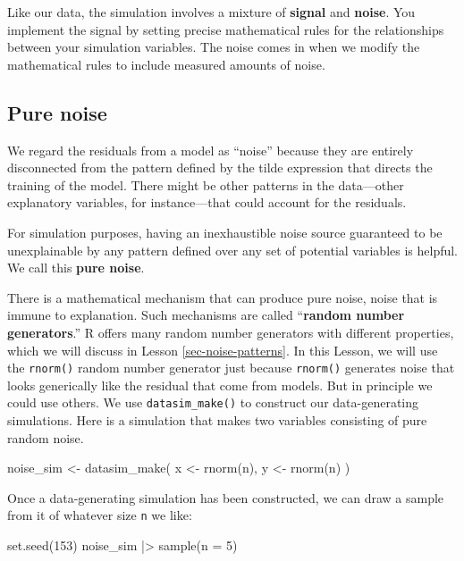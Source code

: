 \documentclass[
  letterpaper,
  DIV=11,
  numbers=noendperiod,
  oneside]{scrartcl}
\newenvironment{Shaded}{\begin{snugshade}}{\end{snugshade}}
\newcommand{\AttributeTok}[1]{\textcolor[rgb]{0.40,0.45,0.13}{#1}}
\newcommand{\DecValTok}[1]{\textcolor[rgb]{0.68,0.00,0.00}{#1}}
\newcommand{\FunctionTok}[1]{\textcolor[rgb]{0.28,0.35,0.67}{#1}}
\newcommand{\NormalTok}[1]{\textcolor[rgb]{0.00,0.23,0.31}{#1}}
\newcommand{\OtherTok}[1]{\textcolor[rgb]{0.00,0.23,0.31}{#1}}
\newcommand{\SpecialCharTok}[1]{\textcolor[rgb]{0.37,0.37,0.37}{#1}}
\begin{document}
Like our data, the simulation involves a mixture of \textbf{signal} and
\textbf{noise}. You implement the signal by setting precise mathematical
rules for the relationships between your simulation variables. The noise
comes in when we modify the mathematical rules to include measured
amounts of noise.

\subsection{Pure noise}\label{sec-pure-noise}

We regard the residuals from a model as ``noise'' because they are
entirely disconnected from the pattern defined by the tilde expression
that directs the training of the model. There might be other patterns in
the data---other explanatory variables, for instance---that could
account for the residuals.

For simulation purposes, having an inexhaustible noise source guaranteed
to be unexplainable by any pattern defined over any set of potential
variables is helpful. We call this \textbf{pure noise}.

There is a mathematical mechanism that can produce pure noise, noise
that is immune to explanation. Such mechanisms are called
``\textbf{random number generators}.'' R offers many random number
generators with different properties, which we will discuss in Lesson
\ref{sec-noise-patterns}. In this Lesson, we will use the
\texttt{rnorm()} random number generator just because \texttt{rnorm()}
generates noise that looks generically like the residual that come from
models. But in principle we could use others. We use
\texttt{datasim\_make()} to construct our data-generating simulations.
Here is a simulation that makes two variables consisting of pure random
noise.

\begin{Shaded}
\begin{Highlighting}[]
\NormalTok{noise\_sim }\OtherTok{\textless{}{-}} \FunctionTok{datasim\_make}\NormalTok{(}
\NormalTok{  x }\OtherTok{\textless{}{-}} \FunctionTok{rnorm}\NormalTok{(n),}
\NormalTok{  y }\OtherTok{\textless{}{-}} \FunctionTok{rnorm}\NormalTok{(n)}
\NormalTok{)}
\end{Highlighting}
\end{Shaded}

Once a data-generating simulation has been constructed, we can draw a
sample from it of whatever size \texttt{n} we like:

\begin{Shaded}
\begin{Highlighting}[]
\FunctionTok{set.seed}\NormalTok{(}\DecValTok{153}\NormalTok{)}
\NormalTok{noise\_sim }\SpecialCharTok{|\textgreater{}} \FunctionTok{sample}\NormalTok{(}\AttributeTok{n =} \DecValTok{5}\NormalTok{)}
\end{Highlighting}
\end{Shaded}
\end{document}
